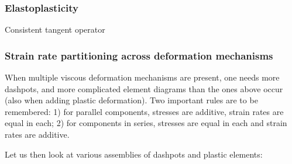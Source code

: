 \subsubsection{Elastoplasticity} 

Consistent tangent operator \cite{sita85,degr94,szjo95}



\subsubsection{Strain rate partitioning across deformation mechanisms}

When multiple viscous deformation mechanisms are present, one needs more dashpots, and 
more complicated element diagrams than the ones above occur (also when adding plastic deformation).
Two important rules are to be remembered:
1) for parallel components, stresses are additive, strain rates are equal in each; 
2) for components in series, stresses are equal in each and strain rates are additive. 

Let us then look at various assemblies of dashpots and plastic elements:

